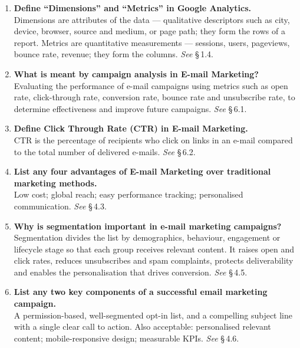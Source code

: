 \begin{enumerate}[leftmargin=2.2em,itemsep=1.1ex]
\item \textbf{Define ``Dimensions'' and ``Metrics'' in Google Analytics.}
      \\
      Dimensions are attributes of the data --- qualitative descriptors such as
      city, device, browser, source and medium, or page path; they form the rows
      of a report. Metrics are quantitative measurements --- sessions, users,
      pageviews, bounce rate, revenue; they form the columns.
      \hfill\emph{See} \S\,1.4.

\item \textbf{What is meant by campaign analysis in E-mail Marketing?}
      \\
      Evaluating the performance of e-mail campaigns using metrics such as open
      rate, click-through rate, conversion rate, bounce rate and unsubscribe
      rate, to determine effectiveness and improve future campaigns.
      \hfill\emph{See} \S\,6.1.

\item \textbf{Define Click Through Rate (CTR) in E-mail Marketing.}
      \\
      CTR is the percentage of recipients who click on links in an e-mail
      compared to the total number of delivered e-mails.
      \hfill\emph{See} \S\,6.2.

\item \textbf{List any four advantages of E-mail Marketing over traditional
      marketing methods.} \\
      Low cost; global reach; easy performance tracking; personalised
      communication. \hfill\emph{See} \S\,4.3.

\item \textbf{Why is segmentation important in e-mail marketing campaigns?}
      \\
      Segmentation divides the list by demographics, behaviour, engagement or
      lifecycle stage so that each group receives relevant content. It raises open
      and click rates, reduces unsubscribes and spam complaints, protects
      deliverability and enables the personalisation that drives conversion.
      \hfill\emph{See} \S\,4.5.

\item \textbf{List any two key components of a successful email marketing
      campaign.} \\
      A permission-based, well-segmented opt-in list, and a compelling subject
      line with a single clear call to action. Also acceptable: personalised
      relevant content; mobile-responsive design; measurable KPIs.
      \hfill\emph{See} \S\,4.6.


\end{enumerate}
